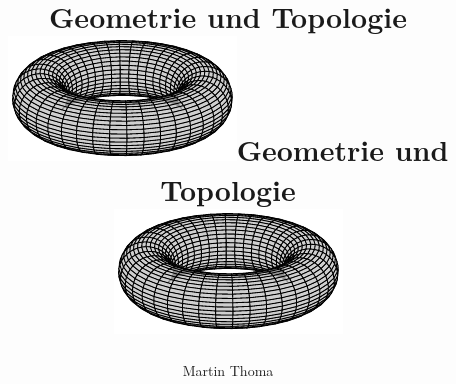 \begin{titlepage}
    \author{Martin Thoma}
	\ifAFive
    \title{Geometrie und Topologie\\\vspace{4cm}
        \includegraphics[width=0.9\linewidth]{figures/Torus.pdf}}
	\else
    \title{Geometrie und Topologie\\\vspace{10cm}
        \includegraphics[width=0.9\linewidth]{figures/Torus.pdf}}	
	\fi
    \maketitle
\end{titlepage}
